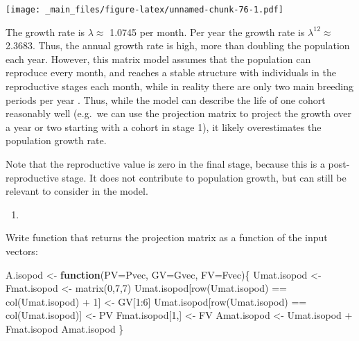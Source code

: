 \documentclass[
]{book}
\newenvironment{Shaded}{\begin{snugshade}}{\end{snugshade}}
\newcommand{\AttributeTok}[1]{\textcolor[rgb]{0.77,0.63,0.00}{#1}}
\newcommand{\ControlFlowTok}[1]{\textcolor[rgb]{0.13,0.29,0.53}{\textbf{#1}}}
\newcommand{\DecValTok}[1]{\textcolor[rgb]{0.00,0.00,0.81}{#1}}
\newcommand{\FunctionTok}[1]{\textcolor[rgb]{0.00,0.00,0.00}{#1}}
\newcommand{\NormalTok}[1]{#1}
\newcommand{\OtherTok}[1]{\textcolor[rgb]{0.56,0.35,0.01}{#1}}
\newcommand{\SpecialCharTok}[1]{\textcolor[rgb]{0.00,0.00,0.00}{#1}}
\providecommand{\tightlist}{%
  \setlength{\itemsep}{0pt}\setlength{\parskip}{0pt}}
\begin{document}
\texttt{[image: \_main\_files/figure-latex/unnamed-chunk-76-1.pdf]}

The growth rate is \(\lambda\approx\) 1.0745 per month. Per year the growth rate is \(\lambda^12\approx\) 2.3683. Thus, the annual growth rate is high, more than doubling the population each year. However, this matrix model assumes that the population can reproduce every month, and reaches a stable structure with individuals in the reproductive stages each month, while in reality there are only two main breeding periods per year \citep{Kammenga1}. Thus, while the model can describe the life of one cohort reasonably well (e.g.~we can use the projection matrix to project the growth over a year or two starting with a cohort in stage 1), it likely overestimates the population growth rate.

Note that the reproductive value is zero in the final stage, because this is a post-reproductive stage. It does not contribute to population growth, but can still be relevant to consider in the model.

\begin{enumerate}
\def\labelenumi{\arabic{enumi}.}
\setcounter{enumi}{3}
\tightlist
\item
\end{enumerate}

Write function that returns the projection matrix as a function of the input vectors:

\begin{Shaded}
\begin{Highlighting}[]
\NormalTok{A.isopod }\OtherTok{\textless{}{-}} \ControlFlowTok{function}\NormalTok{(}\AttributeTok{PV=}\NormalTok{Pvec, }\AttributeTok{GV=}\NormalTok{Gvec, }\AttributeTok{FV=}\NormalTok{Fvec)\{}
\NormalTok{  Umat.isopod }\OtherTok{\textless{}{-}}\NormalTok{ Fmat.isopod }\OtherTok{\textless{}{-}} \FunctionTok{matrix}\NormalTok{(}\DecValTok{0}\NormalTok{,}\DecValTok{7}\NormalTok{,}\DecValTok{7}\NormalTok{)}
\NormalTok{  Umat.isopod[}\FunctionTok{row}\NormalTok{(Umat.isopod) }\SpecialCharTok{==} \FunctionTok{col}\NormalTok{(Umat.isopod) }\SpecialCharTok{+} \DecValTok{1}\NormalTok{] }\OtherTok{\textless{}{-}}\NormalTok{ GV[}\DecValTok{1}\SpecialCharTok{:}\DecValTok{6}\NormalTok{]}
\NormalTok{  Umat.isopod[}\FunctionTok{row}\NormalTok{(Umat.isopod) }\SpecialCharTok{==} \FunctionTok{col}\NormalTok{(Umat.isopod)] }\OtherTok{\textless{}{-}}\NormalTok{ PV}
\NormalTok{  Fmat.isopod[}\DecValTok{1}\NormalTok{,] }\OtherTok{\textless{}{-}}\NormalTok{ FV}
\NormalTok{  Amat.isopod }\OtherTok{\textless{}{-}}\NormalTok{ Umat.isopod }\SpecialCharTok{+}\NormalTok{ Fmat.isopod}
\NormalTok{  Amat.isopod}
\NormalTok{\}}
\end{Highlighting}
\end{Shaded}
\end{document}
